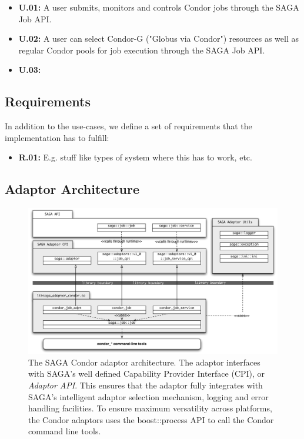 \begin{itemize}
\item \textbf{U.01:} A user submits, monitors and controls Condor jobs through
the SAGA Job API.

\item \textbf{U.02:} A user can select Condor-G ("Globus via Condor") resources
as well as regular Condor pools for job execution through the SAGA Job API.

\item \textbf{U.03:}

\end{itemize}

\subsection{Requirements}

In addition to the use-cases, we define a set of requirements that the 
implementation has to fulfill:

\begin{itemize}
\item \textbf{R.01:} E.g. stuff like types of system where this has to work, etc.
\end{itemize}

\subsection{Adaptor Architecture}

\begin{figure}
  \includegraphics[width=1.0\textwidth]{./figures/condor_adaptor_arch}
  \caption{\footnotesize The SAGA Condor adaptor architecture. The adaptor interfaces
  with SAGA's well defined Capability Provider Interface (CPI), or \textit{Adaptor API}.
  This ensures that the adaptor fully integrates with SAGA's intelligent adaptor selection
  mechanism, logging and error handling facilities. To ensure maximum versatility across
  platforms, the Condor adaptors uses the boost::process API to call the Condor command 
  line tools. }
  
\label{adaptor_arch}
\end{figure}






